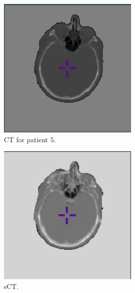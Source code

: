 \begin{figure}[H]
\begin{subfigure}[b]{0.3\textwidth}
        \includegraphics[width=0.75\textwidth]{colager/loocv_ct/loocv_011030_ct.png}
        \caption{CT for patient 5.}
        \label{col:loocv_ct_pat5_ct}
    \end{subfigure}\hfill
    \begin{subfigure}[b]{0.3\textwidth}
        \centering
        \includegraphics[width=0.75\textwidth]{colager/loocv_ct/loocv_011030_sct.png}
        \caption{sCT.}
        \label{col:loocv_ct_pat5_sct}
    \end{subfigure}\hfill
    \begin{subfigure}[b]{0.3\textwidth}
        \centering

\end{subfigure}
\end{figure}
